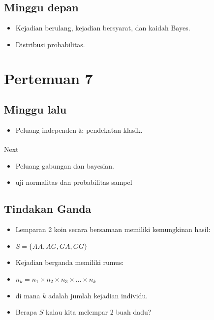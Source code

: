 \documentclass[
  letterpaper,
  DIV=11,
  numbers=noendperiod]{scrartcl}
\makeatletter
\let\oldparagraph\paragraph
\renewcommand{\paragraph}{
    \@ifstar
      \xxxParagraphStar
      \xxxParagraphNoStar
  }
\newcommand{\xxxParagraphStar}[1]{\oldparagraph*{#1}\mbox{}}
\newcommand{\xxxParagraphNoStar}[1]{\oldparagraph{#1}\mbox{}}
\providecommand{\tightlist}{%
  \setlength{\itemsep}{0pt}\setlength{\parskip}{0pt}}\usepackage{longtable,booktabs,array}
\makeatother
\begin{document}
\subsection{Minggu depan}\label{minggu-depan}

\begin{itemize}
\item
  Kejadian berulang, kejadian bersyarat, dan kaidah Bayes.
\item
  Distribusi probabilitas.
\end{itemize}

\section{Pertemuan 7}\label{pertemuan-7}

\subsection{Minggu lalu}\label{minggu-lalu-1}

\begin{itemize}
\tightlist
\item
  Peluang independen \& pendekatan klasik.
\end{itemize}

\paragraph{Next}\label{next-1}

\begin{itemize}
\tightlist
\item
  Peluang gabungan dan bayesian.
\item
  uji normalitas dan probabilitas sampel
\end{itemize}

\subsection{Tindakan Ganda}\label{tindakan-ganda}

\begin{itemize}
\item
  Lemparan 2 koin secara bersamaan memiliki kemungkinan hasil:
\item
  \(S=\{AA,AG,GA,GG\}\)
\item
  Kejadian berganda memiliki rumus:
\item
  \(n_k=n_1 \times n_2 \times n_3 \times ... \times n_k\)
\item
  di mana \(k\) adalah jumlah kejadian individu.
\item
  Berapa \(S\) kalau kita melempar 2 buah dadu?
\end{itemize}
\end{document}
